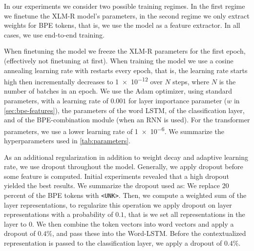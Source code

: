 \documentclass[11pt]{article}
\newcommand\citep{\cite}
\begin{document}
     In our experiments we consider two possible training regimes. In
     the first regime we finetune the XLM-R model's parameters, in the
     second regime we only extract weights for BPE tokens, that is, we
     use the model as a feature extractor. In all cases, we use
     end-to-end training.
     
                             When finetuning the model we freeze the
     XLM-R parameters for the first epoch, (effectively not finetuning
     at first).  When training the model we use a cosine annealing
     learning rate \citep{loshchilov2016sgdr} with restarts every
     epoch, that is, the learning rate starts high then incrementally
     decreases to \num{1e-12} over $N$ steps, where $N$ is the
     number of batches in an epoch.  We use the Adam optimizer, using
     standard parameters, with a learning rate of $0.001$ for layer
     importance parameter ($w$ in \cref{sec:bpe-features}), the
     parameters of the word LSTM, of the classification layer, and of
     the BPE-combination module (when an RNN is used).  For the
     transformer parameters, we use a lower learning rate of
     \num{1e-6}.  We summarize the hyperparameters used in
     \cref{tab:parameters}.

                As an additional regularization in addition to weight
     decay and adaptive learning rate, we use dropout throughout the
     model.  Generally, we apply dropout before some feature is
     computed. Initial experiments revealed that a high dropout
     yielded the best results. We summarize the dropout used as:
        We replace 20 percent of the BPE tokens with
     \texttt{<UNK>}. Then, we compute a weighted sum of the layer
     representations, to regularize this operation we apply dropout on
     layer representations with a probability of $0.1$, that is we set
     all representations in the layer to $0$. We then combine the
     token vectors into word vectors and apply a dropout of $0.4\%$,
     and pass these into the Word-LSTM. Before the contextualized
     representation is passed to the classification layer, we apply a
     dropout of $0.4\%$.
    

    
\end{document}
